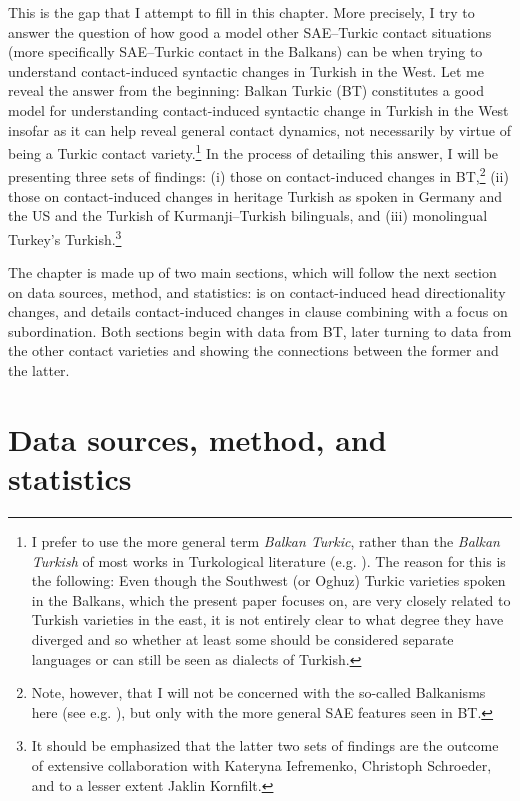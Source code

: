 \documentclass[output=paper,colorlinks,citecolor=brown]{langscibook}
\begin{document}
This is the gap that I attempt to fill in this chapter. More precisely, I try to answer the question of how good a model other SAE--Turkic contact situations (more specifically SAE--Turkic contact in the Balkans) can be when trying to understand contact\hyp induced syntactic changes in Turkish in the West. Let me reveal the answer from the beginning: Balkan Turkic (BT) constitutes a good model for understanding contact-induced syntactic change in Turkish in the West insofar as it can help reveal general contact dynamics, not necessarily by virtue of being a Turkic contact variety.\footnote{I prefer to use the more general term \textit{Balkan Turkic}, rather than the \textit{Balkan Turkish} of most works in Turkological literature (e.g. \citealt{Johanson.2021}). The reason for this is the following: Even though the Southwest (or Oghuz) Turkic varieties spoken in the Balkans, which the present paper focuses on, are very closely related to Turkish varieties in the east, it is not entirely clear to what degree they have diverged and so whether at least some should be considered separate languages or can still be seen as dialects of Turkish.} In the process of detailing this answer, I will be presenting three sets of findings: (i) those on contact-induced changes in BT,\footnote{Note, however, that I will not be concerned with the so-called Balkanisms here (see e.g. \citealt[540--541]{Joseph.2020}), but only with the more general SAE features seen in BT.} (ii) those on contact-induced changes in heritage Turkish as spoken in Germany and the US and the Turkish of Kurmanji--Turkish bilinguals, and (iii) monolingual Turkey's Turkish.\footnote{It should be emphasized that the latter two sets of findings are the outcome of extensive collaboration with Kateryna Iefremenko, Christoph Schroeder, and to a lesser extent Jaklin Kornfilt.}

The chapter is made up of two main sections, which will follow the next section on data sources, method, and statistics:  is on contact-induced head directionality changes, and  details contact-induced changes in clause combining with a focus on subordination. Both sections begin with data from BT, later turning to data from the other contact varieties and showing the connections between the former and the latter. 

\section{Data sources, method, and statistics}
\label{sec:keskin:HD_method}
\end{document}
